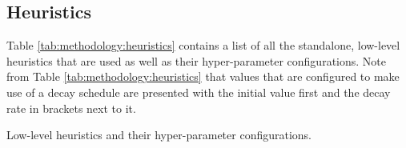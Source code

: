 \subsection{Heuristics}\label{sec:methodology:heuristics}

Table \ref{tab:methodology:heuristics} contains a list of all the standalone, low-level heuristics that are used as well as their hyper-parameter configurations. Note from Table \ref{tab:methodology:heuristics} that values that are configured to make use of a decay schedule are presented with the initial value first and the decay rate in brackets next to it.


\begin{table}[htbp]
	\centering
	\caption{Low-level heuristics and their hyper-parameter configurations.}
	\label{tab:methodology:heuristics}%
	\par\bigskip
	\resizebox{0.7\textwidth}{!}{

}
\end{table}
